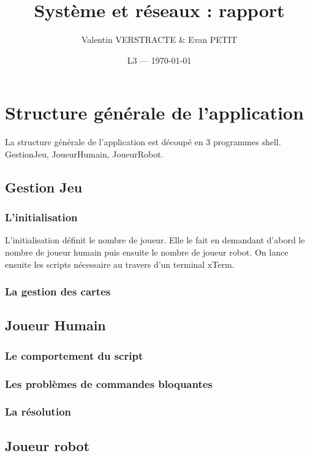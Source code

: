 \documentclass{article}
\title{Système et réseaux : rapport} %
\author{Valentin VERSTRACTE \& Evan PETIT}
\date{L3 --- \today} %
\begin{document}
\maketitle %



\section{Structure générale de l'application}
La structure générale de l'application est découpé en 3 programmes shell. GestionJeu, JoueurHumain, JoueurRobot.

\subsection{Gestion Jeu}
\subsubsection{L'initialisation}

L'initialisation définit le nombre de joueur. Elle le fait en demandant d'abord le nombre de joueur humain puis ensuite le nombre de joueur robot. On lance ensuite les scripts nécessaire au travers d'un terminal xTerm. 

\subsubsection{La gestion des cartes }

\subsection{Joueur Humain}
\subsubsection{Le comportement du script}
\subsubsection{Les problèmes de commandes bloquantes}
\subsubsection{La résolution}

\subsection{Joueur robot}
\end{document}
